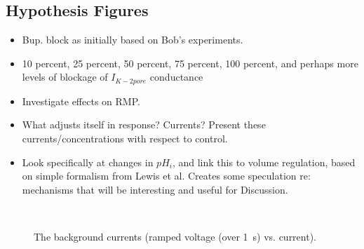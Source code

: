 \subsection{Hypothesis Figures}
\begin{itemize}
\item Bup. block as initially based on Bob's experiments.
\item 10 percent, 25 percent, 50 percent, 75 percent, 100 percent, and
  perhaps more levels of blockage of $I_{K-2pore}$ conductance
\item Investigate effects on RMP.
\item What adjusts itself in response? Currents? Present these
    currents/concentrations with respect to control.
\item Look specifically at changes in $pH_i$, and link this to volume
  regulation, based on simple formalism from Lewis et al. Creates some
  speculation re: mechanisms that will be interesting and useful for
  Discussion.
\end{itemize}

\begin{figure}
  \centering
  \\
  \subfloat{\hspace{0.36\textwidth}}
  \caption{The background currents (ramped voltage (over 1~s) vs. current).}
  \label{fig:background-currents-vi}
\end{figure}

